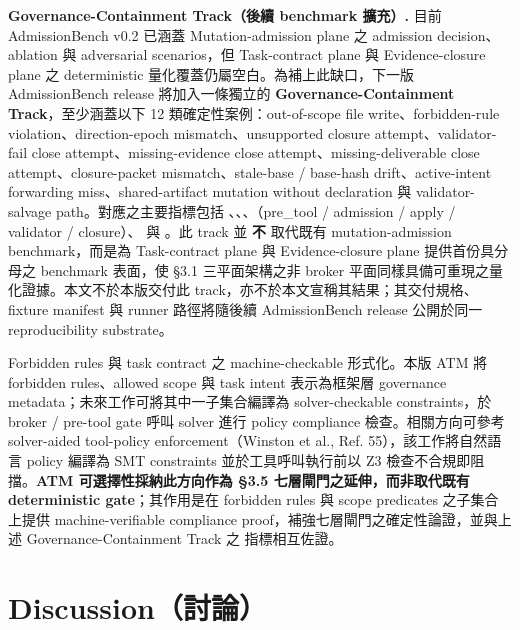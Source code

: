 \documentclass[a4paper,fontset=none]{ctexart}
\begin{document}
\textbf{Governance-Containment Track（後續 benchmark 擴充）.} 目前 AdmissionBench v0.2 已涵蓋 Mutation-admission plane 之 admission decision、ablation 與 adversarial scenarios，但 Task-contract plane 與 Evidence-closure plane 之 deterministic 量化覆蓋仍屬空白。為補上此缺口，下一版 AdmissionBench release 將加入一條獨立的 \textbf{Governance-Containment Track}，至少涵蓋以下 12 類確定性案例：out-of-scope file write、forbidden-rule violation、direction-epoch mismatch、unsupported closure attempt、validator-fail close attempt、missing-evidence close attempt、missing-deliverable close attempt、closure-packet mismatch、stale-base / base-hash drift、active-intent forwarding miss、shared-artifact mutation without declaration 與 validator-salvage path。對應之主要指標包括 \texttt{}、\texttt{}、\texttt{}、\texttt{}（pre\_tool / admission / apply / validator / closure）、\texttt{} 與 \texttt{}。此 track 並 \textbf{不} 取代既有 mutation-admission benchmark，而是為 Task-contract plane 與 Evidence-closure plane 提供首份具分母之 benchmark 表面，使 §3.1 三平面架構之非 broker 平面同樣具備可重現之量化證據。本文不於本版交付此 track，亦不於本文宣稱其結果；其交付規格、fixture manifest 與 runner 路徑將隨後續 AdmissionBench release 公開於同一 reproducibility substrate。

Forbidden rules 與 task contract 之 machine-checkable 形式化。本版 ATM 將 forbidden rules、allowed scope 與 task intent 表示為框架層 governance metadata；未來工作可將其中一子集合編譯為 solver-checkable constraints，於 broker / pre-tool gate 呼叫 solver 進行 policy compliance 檢查。相關方向可參考 solver-aided tool-policy enforcement（Winston et al., Ref. 55），該工作將自然語言 policy 編譯為 SMT constraints 並於工具呼叫執行前以 Z3 檢查不合規即阻擋。\textbf{ATM 可選擇性採納此方向作為 §3.5 七層閘門之延伸，而非取代既有 deterministic gate}；其作用是在 forbidden rules 與 scope predicates 之子集合上提供 machine-verifiable compliance proof，補強七層閘門之確定性論證，並與上述 Governance-Containment Track 之 \texttt{} 指標相互佐證。

\medskip

\section{Discussion（討論）}
\end{document}
